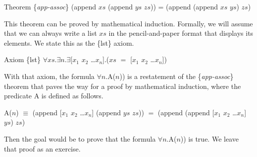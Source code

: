 \begin{samepage}
\label{app-assoc}
\begin{center}
Theorem \{\emph{app-assoc}\} (append $xs$ (append $ys$ $zs$)) = (append (append $xs$ $ys$) $zs$)
\end{center}
\end{samepage}

This theorem can be proved by mathematical induction.
Formally, we will assume that
we can always write a list $xs$ in the pencil-and-paper format that
displays its elements. We state this as the \{lst\} axiom.

\begin{center}
\label{axiom:lst}
Axiom \{lst\} $\forall xs.\exists n.\exists$[$x_1$ $x_2$ \dots $x_n$].($xs$ $=$ [$x_1$ $x_2$ \dots $x_n$])
\end{center}

With that axiom, the formula $\forall$$n$.A($n$))
is a restatement of the \{\emph{app-assoc}\} theorem that paves the way for a proof
by mathematical induction, where the predicate A is defined as follows.

\begin{samepage}
\begin{center}
A($n$) $\equiv$ (append [$x_1$ $x_2$ \dots $x_n$] (append $ys$ $zs$)) $=$ (append (append [$x_1$ $x_2$ \dots $x_n$] $ys$) $zs$)
\end{center}
\end{samepage}

Then the goal would be to prove that the formula $\forall$$n$.A($n$)) is true.
We leave that proof as an exercise.

